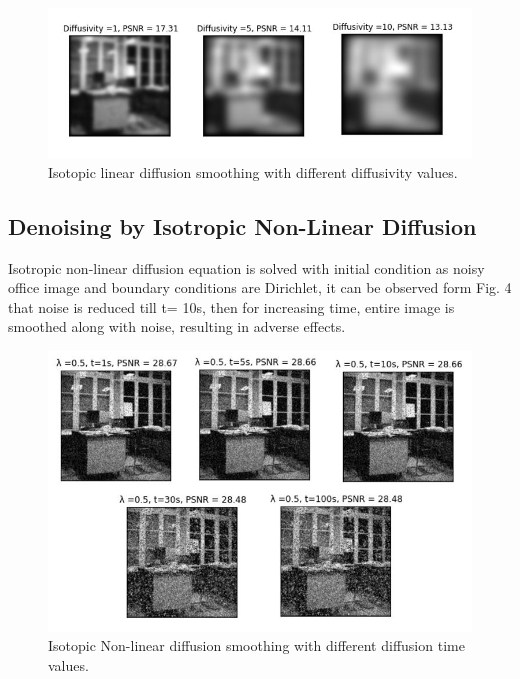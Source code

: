 \documentclass{ipol}
\begin{document}
\begin{figure}[!htbp]
\begin{center}
\includegraphics[scale=0.75]{./images/IsotropicLinear_ChangingD}
\caption{Isotopic linear diffusion smoothing with different diffusivity values.}
\label{fig:example}
\end{center}
\end{figure}

\subsection{Denoising by Isotropic Non-Linear Diffusion}
Isotropic non-linear diffusion equation is solved with initial condition as noisy office image and boundary conditions are Dirichlet, it can be observed form Fig. 4 that noise is reduced till t= 10s, then for increasing time, entire image is smoothed along with noise, resulting in adverse effects.

\begin{figure}[!htbp]
\begin{center}
\includegraphics[scale=0.75]{./images/IsotropicNonLinear_ChangedTime}
\caption{Isotopic Non-linear diffusion smoothing with different diffusion time values.}
\label{fig:example}
\end{center}
\end{figure}
\end{document}
